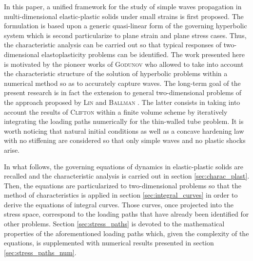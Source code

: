 In this paper, a unified framework for the study of simple waves propagation in multi-dimensional elastic-plastic solids under small strains is first proposed.
The formulation is based upon a generic quasi-linear form of the governing hyperbolic system which is second particularize to plane strain and plane stress cases.
Thus, the characteristic analysis can be carried out so that typical responses of two-dimensional elastoplasticity problems can be identified.
The work presented here is motivated by the pioneer works of \textsc{Godunov} \cite{Godunov_method} who allowed to take into account the characteristic structure of the solution of hyperbolic problems within a numerical method so as to accurately capture waves.
The long-term goal of the present research is in fact the extension to general two-dimensional problems of the approach proposed by \textsc{Lin} and \textsc{Ballman} \cite{Lin_et_Ballman}.
The latter consists in taking into account the results of \textsc{Clifton} within a finite volume scheme by iteratively integrating the loading paths numerically for the thin-walled tube problem.
It is worth noticing that natural initial conditions as well as a concave hardening law with no stiffening are considered so that only simple waves and no plastic shocks arise.

In what follows, the governing equations of dynamics in elastic-plastic solids are recalled and the characteristic analysis is carried out in section \ref{sec:charac_plast}.
Then, the equations are particularized to two-dimensional problems so that the method of characteristics is applied in section \ref{sec:integral_curves} in order to derive the equations of integral curves.
Those curves, once projected into the stress space, correspond to the loading paths that have already been identified for other problems.
Section \ref{sec:stress_paths} is devoted to the mathematical properties of the aforementioned loading paths which, given the complexity of the equations, is supplemented with numerical results presented in section \ref{sec:stress_paths_num}.




